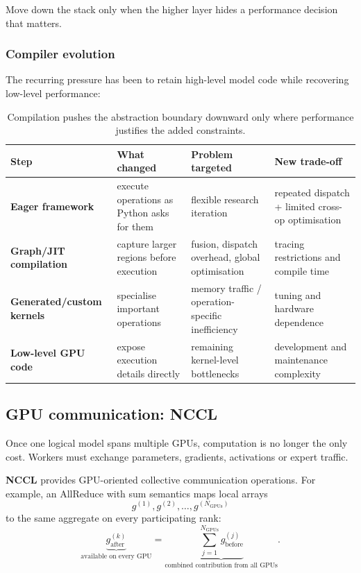 \begin{calloutintuition}
Move down the stack only when the higher layer hides a performance decision that matters.
\end{calloutintuition}

\subsubsection*{Compiler evolution}

The recurring pressure has been to retain high-level model code while recovering low-level performance:

\begin{table}[ht]
\centering
\small
\begin{tabularx}{\textwidth}{>{\bfseries}p{2.3cm} X X X}
\toprule
Step & What changed & Problem targeted & New trade-off \\
\midrule
Eager framework & execute operations as Python asks for them & flexible research iteration & repeated dispatch + limited cross-op optimisation \\
Graph/JIT compilation & capture larger regions before execution & fusion, dispatch overhead, global optimisation & tracing restrictions and compile time \\
Generated/custom kernels & specialise important operations & memory traffic / operation-specific inefficiency & tuning and hardware dependence \\
Low-level GPU code & expose execution details directly & remaining kernel-level bottlenecks & development and maintenance complexity \\
\bottomrule
\end{tabularx}
\caption{Compilation pushes the abstraction boundary downward only where performance justifies the added constraints.}
\end{table}


\subsection{GPU communication: NCCL}

Once one logical model spans multiple GPUs, computation is no longer the only cost.
Workers must exchange parameters, gradients, activations or expert traffic.

\textbf{NCCL} provides GPU-oriented collective communication operations.
For example, an AllReduce with sum semantics maps local arrays
\[
g^{(1)},g^{(2)},\ldots,g^{(N_{\text{GPUs}})}
\]
to the same aggregate on every participating rank:
\[
\underbrace{g^{(k)}_{\text{after}}}_{\text{available on every GPU}}
=
\underbrace{\sum_{j=1}^{N_{\text{GPUs}}} g^{(j)}_{\text{before}}}_{\text{combined contribution from all GPUs}}.
\]

